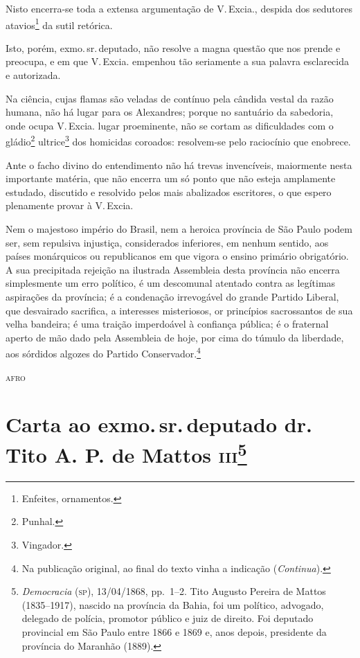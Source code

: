 Nisto encerra-se toda a extensa argumentação de V.\,Excia., despida dos
sedutores atavios\footnote{Enfeites, ornamentos.} da sutil retórica.

Isto, porém, exmo.\,sr.\,deputado, não resolve a magna questão que nos
prende e preocupa, e em que V.\,Excia. empenhou tão seriamente a sua
palavra esclarecida e autorizada.

Na ciência, cujas flamas são veladas de contínuo pela cândida vestal da
razão humana, não há lugar para os Alexandres; porque no santuário da
sabedoria, onde ocupa V.\,Excia. lugar proeminente, não se cortam as
dificuldades com o gládio\footnote{Punhal.} ultrice\footnote{
  Vingador.} dos homicidas coroados: resolvem-se pelo raciocínio que
enobrece.

Ante o facho divino do entendimento não há trevas invencíveis,
maiormente nesta importante matéria, que não encerra um só ponto que não
esteja amplamente estudado, discutido e resolvido pelos mais abalizados
escritores, o que espero plenamente provar à V.\,Excia.

Nem o majestoso império do Brasil, nem a heroica província de São Paulo
podem ser, sem repulsiva injustiça, considerados inferiores, em nenhum
sentido, aos países monárquicos ou republicanos em que vigora o ensino
primário obrigatório. A sua precipitada rejeição na ilustrada Assembleia
desta província não encerra simplesmente um erro político, é um
descomunal atentado contra as legítimas aspirações da província; é a
condenação irrevogável do grande Partido Liberal, que desvairado
sacrifica, a interesses misteriosos, or princípios sacrossantos de sua
velha bandeira; é uma traição imperdoável à confiança pública; é o
fraternal aperto de mão dado pela Assembleia de hoje, por cima do túmulo
da liberdade, aos sórdidos algozes do Partido Conservador.\footnote{Na publicação original, ao final do texto vinha a indicação (\emph{Continua}).}

\begin{flushright}
\textsc{afro}
\end{flushright}

\chapter{Carta ao exmo.\,sr.\,deputado dr.\,Tito A. P. de Mattos
\textsc{iii}\footnote{\emph{Democracia} (\textsc{sp}), 13/04/1868, pp.~1--2.
  Tito Augusto Pereira de Mattos (1835--1917), nascido na província da
  Bahia, foi um político, advogado, delegado de polícia, promotor
  público e juiz de direito. Foi deputado provincial em São Paulo entre
  1866 e 1869 e, anos depois, presidente da província do Maranhão
  (1889).}}

